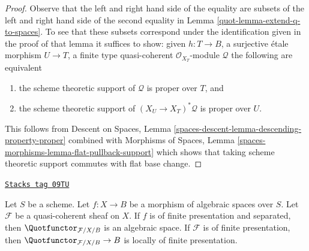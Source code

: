\begin{proof}

Observe that the left and right hand side of the equality are
subsets of the left and right hand side of the second equality in
Lemma \ref{quot-lemma-extend-q-to-spaces}.
To see that these subsets correspond under
the identification given in the proof of that lemma
it suffices to show: given $h : T \to B$,
a surjective \'etale morphism $U \to T$,
a finite type quasi-coherent $\mathcal{O}_{X_T}$-module $\mathcal{Q}$
the following are equivalent
\begin{enumerate}
\item the scheme theoretic support of $\mathcal{Q}$ is proper
over $T$, and
\item the scheme theoretic support of $(X_U \to X_T)^*\mathcal{Q}$
is proper over $U$.
\end{enumerate}
This follows from
Descent on Spaces, Lemma \ref{spaces-descent-lemma-descending-property-proper}
combined with
Morphisms of Spaces, Lemma \ref{spaces-morphisms-lemma-flat-pullback-support}
which shows that taking scheme theoretic support commutes
with flat base change.
\end{proof}

\begin{proposition}[Quot]
\label{quot-proposition-quot}
\href{https://stacks.math.columbia.edu/tag/09TU}{\texttt{Stacks tag 09TU}}

Let $S$ be a scheme. Let $f : X \to B$ be a morphism of algebraic
spaces over $S$. Let $\mathcal{F}$ be a quasi-coherent sheaf
on $X$. If $f$ is of finite presentation and separated, then
$\Quotfunctor_{\mathcal{F}/X/B}$
is an algebraic space. If $\mathcal{F}$ is of finite presentation,
then $\Quotfunctor_{\mathcal{F}/X/B} \to B$ is locally of finite presentation.
\end{proposition}

